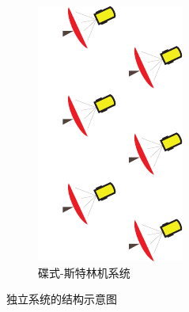 \begin{figure}[htbp]
\begin{subfigure}[b]{0.26\columnwidth}
	\includegraphics[width = \columnwidth]{fig/Dish-s}
	\caption{碟式-斯特林机系统}\label{fig:DishStirling}
	\end{subfigure}
	
	\caption{独立系统的结构示意图}\label{fig:Stand-alone-systems}
\end{figure}


